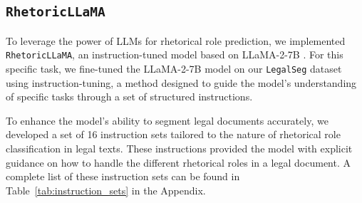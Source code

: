 \subsection{\texttt{RhetoricLLaMA}}
To leverage the power of LLMs for rhetorical role prediction, we implemented \texttt{RhetoricLLaMA}, an instruction-tuned model based on LLaMA-2-7B \citet{touvron2023llama}. For this specific task, we fine-tuned the LLaMA-2-7B model on our \texttt{LegalSeg} dataset using instruction-tuning, a method designed to guide the model’s understanding of specific tasks through a set of structured instructions.

To enhance the model's ability to segment legal documents accurately, we developed a set of 16 instruction sets tailored to the nature of rhetorical role classification in legal texts. These instructions provided the model with explicit guidance on how to handle the different rhetorical roles in a legal document. A complete list of these instruction sets can be found in Table~\ref{tab:instruction_sets} in the Appendix.



